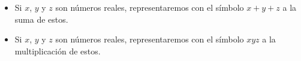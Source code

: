 \documentclass[11pt]{article}
\begin{document}
\begin{itemize}%
\item Si $x$, $y$ y $z$ son números reales, representaremos con el símbolo $x+y+z$ a la suma de estos.
%
%
%

\item Si $x$, $y$ y $z$ son números reales, representaremos con el símbolo $xyz$ a la multiplicación de estos.
%
%

\end{itemize}
\end{document}
